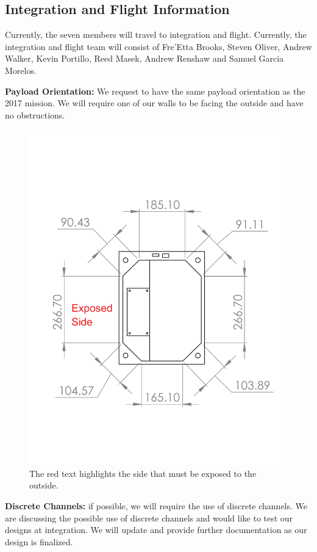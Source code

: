 \newpage
\subsection{Integration and Flight Information}

Currently, the seven members will travel to integration and flight.  Currently,
the integration and flight team will consist of Fre'Etta Brooks, Steven Oliver, Andrew Walker,
Kevin Portillo, Reed Masek, Andrew Renshaw and Samuel Garcia Morelos.

\textbf{Payload Orientation:} We request to have the same payload orientation as the 2017 mission.
We will require one of our walls to be facing the outside and have no obstructions.

\begin{figure}[!h]
\begin{center}
\includegraphics[scale=.4]{./Figures/PayloadTop_red.pdf}
\caption{The red text highlights the side that must be exposed to the outside.}
\label{fig:PayloadTop}
\end{center}
\end{figure}

\textbf{Discrete Channels:} if possible, we will require the use of discrete channels.
We are discussing the possible use of discrete channels and would like to test our designs at integration.
We will update and provide further documentation as our design is finalized.
